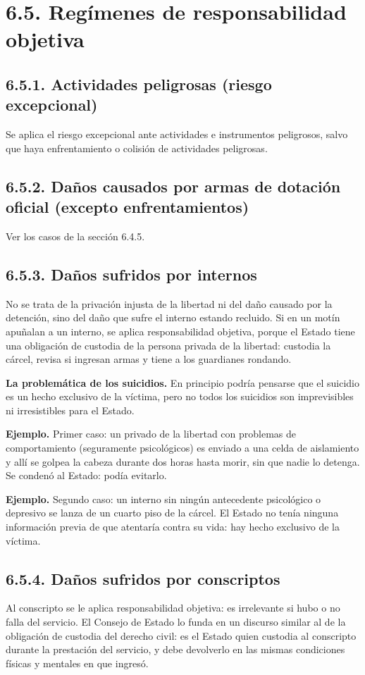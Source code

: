 \section{6.5. Regímenes de responsabilidad objetiva}
\subsection{6.5.1. Actividades peligrosas (riesgo excepcional)}
Se aplica el riesgo excepcional ante actividades e instrumentos peligrosos, salvo que haya enfrentamiento o colisión de actividades peligrosas.

\subsection{6.5.2. Daños causados por armas de dotación oficial (excepto enfrentamientos)}
Ver los casos de la sección 6.4.5.

\subsection{6.5.3. Daños sufridos por internos}
No se trata de la privación injusta de la libertad ni del daño causado por la detención, sino del daño que sufre el interno estando recluido. Si en un motín apuñalan a un interno, se aplica responsabilidad objetiva, porque el Estado tiene una obligación de custodia de la persona privada de la libertad: custodia la cárcel, revisa si ingresan armas y tiene a los guardianes rondando.

\textbf{La problemática de los suicidios.} En principio podría pensarse que el suicidio es un hecho exclusivo de la víctima, pero no todos los suicidios son imprevisibles ni irresistibles para el Estado.

\begin{ejemplo}
\textcolor[HTML]{4F6228}{\textbf{Ejemplo. }}Primer caso: un privado de la libertad con problemas de comportamiento (seguramente psicológicos) es enviado a una celda de aislamiento y allí se golpea la cabeza durante dos horas hasta morir, sin que nadie lo detenga. Se condenó al Estado: podía evitarlo.
\par
\textcolor[HTML]{4F6228}{\textbf{Ejemplo. }}Segundo caso: un interno sin ningún antecedente psicológico o depresivo se lanza de un cuarto piso de la cárcel. El Estado no tenía ninguna información previa de que atentaría contra su vida: hay hecho exclusivo de la víctima.
\end{ejemplo}
\subsection{6.5.4. Daños sufridos por conscriptos}
Al conscripto se le aplica responsabilidad objetiva: es irrelevante si hubo o no falla del servicio. El Consejo de Estado lo funda en un discurso similar al de la obligación de custodia del derecho civil: es el Estado quien custodia al conscripto durante la prestación del servicio, y debe devolverlo en las mismas condiciones físicas y mentales en que ingresó.

